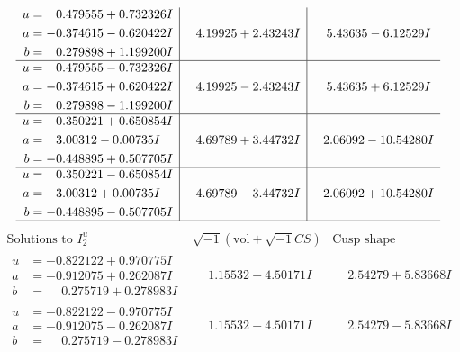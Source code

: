 \documentclass[1p]{elsarticle_modified}
\theoremstyle{definition}
\newcommand{\I}{\sqrt{-1}}
\begin{document}
$$\begin{array}{c|c|c}
\begin{aligned}
u &= \phantom{-}0.479555 + 0.732326 I \\
a &= -0.374615 - 0.620422 I \\
b &= \phantom{-}0.279898 + 1.199200 I\end{aligned}
 & \phantom{-}4.19925 + 2.43243 I & \phantom{-}5.43635 - 6.12529 I \\ \hline\begin{aligned}
u &= \phantom{-}0.479555 - 0.732326 I \\
a &= -0.374615 + 0.620422 I \\
b &= \phantom{-}0.279898 - 1.199200 I\end{aligned}
 & \phantom{-}4.19925 - 2.43243 I & \phantom{-}5.43635 + 6.12529 I \\ \hline\begin{aligned}
u &= \phantom{-}0.350221 + 0.650854 I \\
a &= \phantom{-}3.00312 - 0.00735 I \\
b &= -0.448895 + 0.507705 I\end{aligned}
 & \phantom{-}4.69789 + 3.44732 I & \phantom{-}2.06092 - 10.54280 I \\ \hline\begin{aligned}
u &= \phantom{-}0.350221 - 0.650854 I \\
a &= \phantom{-}3.00312 + 0.00735 I \\
b &= -0.448895 - 0.507705 I\end{aligned}
 & \phantom{-}4.69789 - 3.44732 I & \phantom{-}2.06092 + 10.54280 I\\
 \hline 
 \end{array}$$\newpage$$\begin{array}{c|c|c}  
\text{Solutions to }I^u_{2}& \I (\text{vol} + \sqrt{-1}CS) & \text{Cusp shape}\\
 \hline 
\begin{aligned}
u &= -0.822122 + 0.970775 I \\
a &= -0.912075 + 0.262087 I \\
b &= \phantom{-}0.275719 + 0.278983 I\end{aligned}
 & \phantom{-}1.15532 - 4.50171 I & \phantom{-}2.54279 + 5.83668 I \\ \hline\begin{aligned}
u &= -0.822122 - 0.970775 I \\
a &= -0.912075 - 0.262087 I \\
b &= \phantom{-}0.275719 - 0.278983 I\end{aligned}
 & \phantom{-}1.15532 + 4.50171 I & \phantom{-}2.54279 - 5.83668 I \\ \hline\begin{aligned}

\end{aligned}
\end{array}$$
\end{document}
